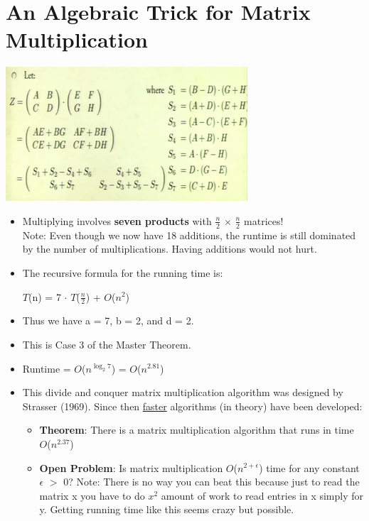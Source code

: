 \documentclass[12pt]{article}
\begin{document}
\section{An Algebraic Trick for Matrix Multiplication}
\renewcommand{\labelitemii}{$\circ$}
\renewcommand{\labelitemiii}{$\cdot$}
\renewcommand{\labelitemiii}{$\rightarrow$}
\includegraphics{lecture47}
\begin{itemize}
\item Multiplying involves \textbf{seven products} with $\frac{n}{2}$ $\times$ $\frac{n}{2}$ matrices!\\
Note: Even though we now have 18 additions, the runtime is still dominated by the number of multiplications. Having additions would not hurt.
\item The recursive formula for the running time is:
	
	\hspace*{\fill} $T$(n) = 7 $\cdot$ $T$($\frac{n}{2}$) + $O$($n^2$)\hspace*{\fill} 
	
	\item Thus we have a = 7, b = 2, and d = 2.
	\item This is Case 3 of the Master Theorem.
	\item Runtime = $O$($n^{\log_2 7}$) = $O$($n^{2.81}$)
\item This divide and conquer matrix multiplication algorithm was designed by Strasser (1969). Since then \underline{faster} algorithms (in theory) have been developed:
	\begin{itemize}
	\item \textbf{Theorem}: There is a matrix multiplication algorithm that runs in time $O$($n^{2.37}$)
	\item \textbf{Open Problem}: Is matrix multiplication $O$($n^{2 + \epsilon}$) time for any constant $\epsilon$ $>$ 0?
	Note: There is no way you can beat this because just to read the matrix x you have to do $x^2$ amount of work to read entries in x simply for y. Getting running time like this seems crazy but possible.
	\end{itemize}
\end{itemize}
\end{document}
